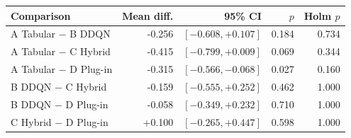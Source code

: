\begin{tabular}{@{}lrrrr@{}}
\toprule
Comparison & Mean diff. & 95\% CI & $p$ & Holm $p$ \\
\midrule
A Tabular $-$ B DDQN & -0.256 & $[-0.608,+0.107]$ & 0.184 & 0.734 \\
A Tabular $-$ C Hybrid & -0.415 & $[-0.799,+0.009]$ & 0.069 & 0.344 \\
A Tabular $-$ D Plug-in & -0.315 & $[-0.566,-0.068]$ & 0.027 & 0.160 \\
B DDQN $-$ C Hybrid & -0.159 & $[-0.555,+0.252]$ & 0.462 & 1.000 \\
B DDQN $-$ D Plug-in & -0.058 & $[-0.349,+0.232]$ & 0.710 & 1.000 \\
C Hybrid $-$ D Plug-in & +0.100 & $[-0.265,+0.447]$ & 0.598 & 1.000 \\
\bottomrule
\end{tabular}
